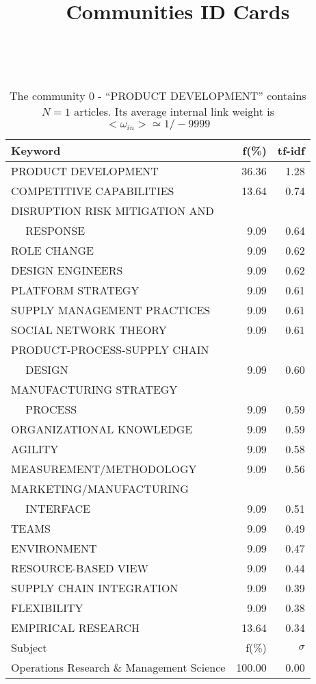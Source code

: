 \documentclass[a4paper,11pt]{report}
\title{{\bf Communities ID Cards}}
\date{\begin{flushleft}This document gather the ``ID Cards'' of the CC communities found within your database.\\
 The CC network was built by keeping a link between articles sharing at least 5 references. The communities characterized here correspond to the ones found in the level 0 (in the sense of the Louvain algo) which gathers more than 0 articles.\\
 These ID cards displays the most frequent keywords, subject categories, journals of publication, institution, countries, authors, references and reference journals of the articles of each community. The significance of an item $\sigma = \sqrt{N} (f - p) / \sqrt{p(1-p)}$ [where $N$ is the number of articles within the community and $f$ and $p$ are the proportion of articles respectively within the community and within the database displaying that item ] is also given (for example $\sigma > 5$ is really highly significant). The tf-idf value which can be calculated by $tf-idf = f*log(frac{1}{p})$ is also given.\\
\vspace{1cm}
\copyright Sebastian Grauwin, Liu Weizhi - (2014) \end{flushleft}}
\begin{document}
\begin{landscape}
\maketitle
\clearpage

\begin{table}[!ht]
\caption{The community 0 - ``PRODUCT DEVELOPMENT'' contains $N = 1$ articles. Its average internal link weight is $<\omega_{in}> \simeq 1/-9999$ }
\textcolor{white}{aa}\\
{\scriptsize\begin{tabular}{|l r  r|}
\hline
Keyword & f(\%) & tf-idf \\
\hline
PRODUCT DEVELOPMENT & 36.36 & 1.28\\
COMPETITIVE CAPABILITIES & 13.64 & 0.74\\
DISRUPTION RISK MITIGATION AND &  &\\
$\quad$ RESPONSE & 9.09 & 0.64\\
ROLE CHANGE & 9.09 & 0.62\\
DESIGN ENGINEERS & 9.09 & 0.62\\
PLATFORM STRATEGY & 9.09 & 0.61\\
SUPPLY MANAGEMENT PRACTICES & 9.09 & 0.61\\
SOCIAL NETWORK THEORY & 9.09 & 0.61\\
PRODUCT-PROCESS-SUPPLY CHAIN &  &\\
$\quad$ DESIGN & 9.09 & 0.60\\
MANUFACTURING STRATEGY &  &\\
$\quad$ PROCESS & 9.09 & 0.59\\
ORGANIZATIONAL KNOWLEDGE & 9.09 & 0.59\\
AGILITY & 9.09 & 0.58\\
MEASUREMENT/METHODOLOGY & 9.09 & 0.56\\
MARKETING/MANUFACTURING &  &\\
$\quad$ INTERFACE & 9.09 & 0.51\\
TEAMS & 9.09 & 0.49\\
ENVIRONMENT & 9.09 & 0.47\\
RESOURCE-BASED VIEW & 9.09 & 0.44\\
SUPPLY CHAIN INTEGRATION & 9.09 & 0.39\\
FLEXIBILITY & 9.09 & 0.38\\
EMPIRICAL RESEARCH & 13.64 & 0.34\\
\hline
\hline
Subject & f(\%) & $\sigma$\\
\hline
Operations Research \& Management Science & 100.00 & 0.00\\

\end{tabular}}
\end{table}
\end{landscape}
\end{document}
